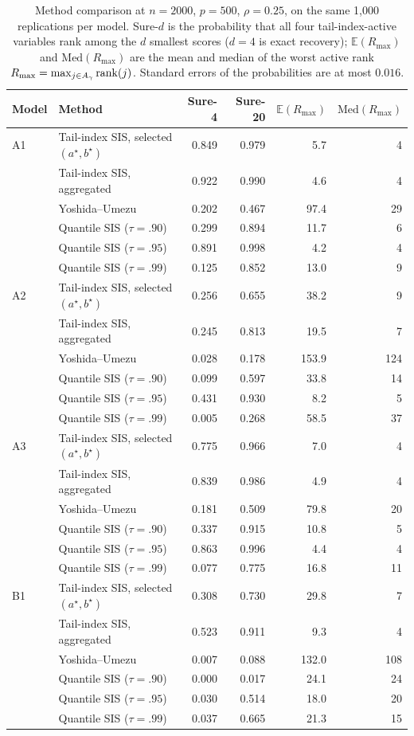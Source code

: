 \begin{table}[t]
\centering
\caption{Method comparison at $n=2000$, $p=500$, $\rho=0.25$, on the same 1{,}000 replications per model. Sure-$d$ is the probability that all four tail-index-active variables rank among the $d$ smallest scores ($d=4$ is exact recovery); $\mathbb{E}(R_{\max})$ and $\mathrm{Med}(R_{\max})$ are the mean and median of the worst active rank $R_{\max}=\max_{j\in A_\gamma}\mathrm{rank}(j)$. Standard errors of the probabilities are at most $0.016$.}
\label{tab:cmp500}
\begin{tabular}{llrrrr}
\toprule
Model & Method & Sure-4 & Sure-20 & $\mathbb{E}(R_{\max})$ & $\mathrm{Med}(R_{\max})$\\
\midrule
A1 & Tail-index SIS, selected $(a^\star,b^\star)$ & 0.849 & 0.979 & 5.7 & 4\\
 & Tail-index SIS, aggregated & 0.922 & 0.990 & 4.6 & 4\\
 & Yoshida--Umezu & 0.202 & 0.467 & 97.4 & 29\\
 & Quantile SIS ($\tau=.90$) & 0.299 & 0.894 & 11.7 & 6\\
 & Quantile SIS ($\tau=.95$) & 0.891 & 0.998 & 4.2 & 4\\
 & Quantile SIS ($\tau=.99$) & 0.125 & 0.852 & 13.0 & 9\\
\addlinespace
A2 & Tail-index SIS, selected $(a^\star,b^\star)$ & 0.256 & 0.655 & 38.2 & 9\\
 & Tail-index SIS, aggregated & 0.245 & 0.813 & 19.5 & 7\\
 & Yoshida--Umezu & 0.028 & 0.178 & 153.9 & 124\\
 & Quantile SIS ($\tau=.90$) & 0.099 & 0.597 & 33.8 & 14\\
 & Quantile SIS ($\tau=.95$) & 0.431 & 0.930 & 8.2 & 5\\
 & Quantile SIS ($\tau=.99$) & 0.005 & 0.268 & 58.5 & 37\\
\addlinespace
A3 & Tail-index SIS, selected $(a^\star,b^\star)$ & 0.775 & 0.966 & 7.0 & 4\\
 & Tail-index SIS, aggregated & 0.839 & 0.986 & 4.9 & 4\\
 & Yoshida--Umezu & 0.181 & 0.509 & 79.8 & 20\\
 & Quantile SIS ($\tau=.90$) & 0.337 & 0.915 & 10.8 & 5\\
 & Quantile SIS ($\tau=.95$) & 0.863 & 0.996 & 4.4 & 4\\
 & Quantile SIS ($\tau=.99$) & 0.077 & 0.775 & 16.8 & 11\\
\addlinespace
B1 & Tail-index SIS, selected $(a^\star,b^\star)$ & 0.308 & 0.730 & 29.8 & 7\\
 & Tail-index SIS, aggregated & 0.523 & 0.911 & 9.3 & 4\\
 & Yoshida--Umezu & 0.007 & 0.088 & 132.0 & 108\\
 & Quantile SIS ($\tau=.90$) & 0.000 & 0.017 & 24.1 & 24\\
 & Quantile SIS ($\tau=.95$) & 0.030 & 0.514 & 18.0 & 20\\
 & Quantile SIS ($\tau=.99$) & 0.037 & 0.665 & 21.3 & 15\\
\bottomrule
\end{tabular}
\end{table}
